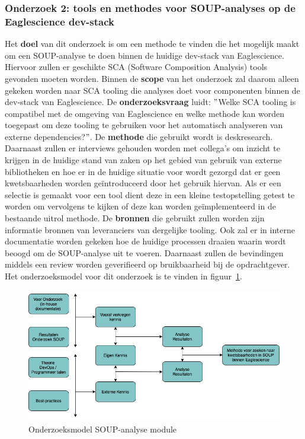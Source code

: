 \subsubsection{Onderzoek 2: tools en methodes voor SOUP-analyses op de Eaglescience dev-stack}
Het \textbf{doel} van dit onderzoek is om een methode te vinden die het mogelijk maakt om een SOUP-analyse te doen binnen de huidige dev-stack van Eaglescience. Hiervoor zullen er geschikte SCA (Software Composition Analysis) tools gevonden moeten worden. Binnen de \textbf{scope} van het onderzoek zal daarom alleen gekeken worden naar SCA tooling die analyses doet voor componenten binnen de dev-stack van Eaglescience. De \textbf{onderzoeksvraag} luidt: $"$Welke SCA tooling is compatibel met de omgeving van Eaglescience en welke methode kan worden toegepast om deze tooling te gebruiken voor het automatisch analyseren van externe dependencies?$"$. De \textbf{methode} die gebruikt wordt is deskresearch. Daarnaast zullen er interviews gehouden worden met collega's om inzicht te krijgen in de huidige stand van zaken op het gebied van gebruik van externe bibliotheken en hoe er in de huidige situatie voor wordt gezorgd dat er geen kwetsbaarheden worden geïntroduceerd door het gebruik hiervan. Als er een selectie is gemaakt voor een tool dient deze in een kleine testopstelling getest te worden om vervolgens te kijken of deze kan worden geïmplementeerd in de bestaande uitrol methode. De \textbf{bronnen} die gebruikt zullen worden zijn informatie bronnen van leveranciers van dergelijke tooling. Ook zal er in interne documentatie worden gekeken hoe de huidige processen draaien waarin wordt beoogd om de SOUP-analyse uit te voeren. Daarnaast zullen de bevindingen middels een review worden geverifieerd op bruikbaarheid bij de opdrachtgever. Het onderzoeksmodel voor dit onderzoek is te vinden in figuur~\ref{fig:OnderzoeksModelSOUPmethode}.

\begin{figure}[htbp]
    \myfloatalign
    \includegraphics[width=12cm]{gfx/OnderzoeksModelSOUPMethode}
    \caption{Onderzoeksmodel SOUP-analyse module}
    \label{fig:OnderzoeksModelSOUPmethode}
\end{figure}

